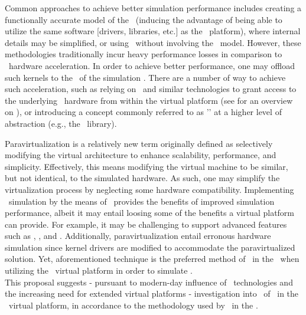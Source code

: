 Common approaches to achieve better simulation performance includes creating a functionally accurate model of the \dvttermgpu\ (inducing the advantage of being able to utilize the same software [drivers, libraries, etc.] as the \dvttermhost\ platform), where internal details may be simplified, or using \dvttermsoftwarerendering\ without involving the \dvttermgpu\ model.
However, these methodologies traditionally incur heavy performance losses in comparison to \dvttermgpu\ hardware acceleration.
In order to achieve better performance, one may offload such kernels to the \dvttermgpu\ of the simulation \dvttermhost .
There are a number of way to achieve such acceleration, such as relying on \dvttermpcipassthrough\ and similar technologies to grant access to the underlying \dvttermhost\ hardware from within the virtual platform (see  for an overview on \dvttermpcipassthrough ), or introducing a concept commonly referred to as '\dvttermparavirtualization ' at a higher level of abstraction (e.g., the \dvttermopengl\ library).

Paravirtualization is a relatively new term originally defined as selectively modifying the virtual architecture to enhance scalability, performance, and simplicity.
Effectively, this means modifying the virtual machine to be similar, but not identical, to the simulated hardware.
As such, one may simplify the virtualization process by neglecting some hardware compatibility.
Implementing \dvttermgpu\ simulation by the means of \dvttermparavirtualization\ provides the benefits of improved simulation performance, albeit it may entail loosing some of the benefits a virtual platform can provide.
For example, it may be challenging to support advanced features such as \dvttermdeterministicexecution , \dvttermcheckpointing , and \dvttermreverseexecution .
Additionally, paravirtualization entail erronous hardware simulation since kernel drivers are modified to accommodate the paravirtualized solution.
Yet, aforementioned technique is the preferred method of \dvttermgoogle\ in the \dvttermandroidsdk\ when utilizing the \dvttermqemu\ virtual platform in order to simulate \dvttermopengles .\\

\noindent
This proposal suggests - pursuant to  modern-day influence of \dvttermgpu\ technologies and the increasing need for extended virtual platforms - investigation into \dvttermparavirtualization\ of \dvttermopengles\ in the \dvttermsimics\ virtual platform, in accordance to the methodology used by \dvttermgoogle\ in the \dvttermandroidsdk .

